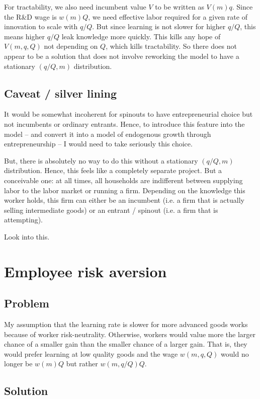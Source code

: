 \documentclass[11pt,english]{article}
\theoremstyle{remark}
\begin{document}
For tractability, we also need incumbent value $V$ to be written as $V(m)q$. Since the R\&D wage is $w(m)Q$, we need effective labor required for a given rate of innovation to scale with $q/Q$. But since learning is not slower for higher $q/Q$, this means higher $q/Q$ leak knowledge more quickly. This kills any hope of $V(m,q,Q)$ not depending on $Q$, which kills tractability. So there does not appear to be a solution that does not involve reworking the model to have a stationary $(q/Q,m)$ distribution.

\subsection{Caveat / silver lining}

It would be somewhat incoherent for spinouts to have entrepreneurial choice but not incumbents or ordinary entrants. Hence, to introduce this feature into the model -- and convert it into a model of endogenous growth through entrepreneurship -- I would need to take seriously this choice. 

But, there is absolutely no way to do this without a stationary $(q/Q,m)$ distribution. Hence, this feels like a completely separate project. But a conceivable one: at all times, all households are indifferent between supplying labor to the labor market or running a firm. Depending on the knowledge this worker holds, this firm can either be an incumbent (i.e. a firm that is actually selling intermediate goods) or an entrant / spinout (i.e. a firm that is attempting). 

Look into this. 


\section{Employee risk aversion}

\subsection*{Problem}
My assumption that the learning rate is slower for more advanced goods works because of worker risk-neutrality. Otherwise, workers would value more the larger chance of a smaller gain than the smaller chance of a larger gain. That is, they would prefer learning at low quality goods and the wage $w(m,q,Q)$ would no longer be $w(m)Q$ but rather $w(m,q/Q) Q$. 

\subsection*{Solution}
\end{document}

